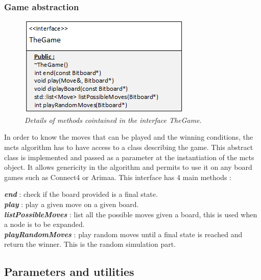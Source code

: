 \subsubsection{Game abstraction}
\begin{figure}[H] 
\centerline{\includegraphics[scale=0.8]{Data_Structure/Img/TheGame.png}}
\caption{\label{fig:thegamedetails}\textit{Details of methods cointained in the interface TheGame}.}
\end{figure}
In order to know the moves that can be played and the winning conditions, the mcts algorithm has to have access to a class describing the game. This abstract class is implemented and passed as a parameter at the instantiation of the mcts object. It allows genericity in the algorithm and permits to use it on any board games such as Connect4 or Arimaa. This interface has 4 main methods : 

\noindent
\textit{\textbf{end}} : check if the board provided is a final state.
\medskip\\
\textit{\textbf{play}} : play a given move on a given board.
\medskip\\
\textit{\textbf{listPossibleMoves}} : list all the possible moves given a board, this is used when a node is to be expanded.
\medskip\\
\textit{\textbf{playRandomMoves}} : play random moves until a final state is reached and return the winner. This is the random simulation part.

\newpage
\subsection{Parameters and utilities}
